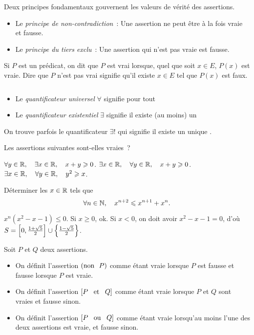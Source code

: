 \documentclass{magnoliaold}
\begin{document}
\begin{remarques}
\remarque Deux principes fondamentaux gouvernent les valeurs de vérité des assertions.
  \begin{itemize}
  \item Le \emph{principe de non-contradiction}~: Une assertion ne peut être à la fois vraie et fausse.
  \item Le \emph{principe du tiers exclu}~: Une assertion qui n'est pas vraie est fausse.
  \end{itemize}
\remarque Si $P$ est un prédicat, on dit que $P$ est vrai lorsque, quel que
  soit $x\in E$, $P(x)$ est vraie. Dire que $P$ n'est pas vrai
  signifie qu'il existe $x\in E$ tel que $P(x)$ est faux.
\end{remarques}

\begin{definition}[utile=-3]
$\quad$
\begin{itemize}
\item Le \emph{quantificateur universel} $\forall$ signifie \og pour tout \fg
\item Le \emph{quantificateur existentiel} $\exists$ signifie \og il existe (au moins) un \fg
\end{itemize}
\end{definition}

\begin{remarqueUnique}
\remarque On trouve parfois le quantificateur $\exists !$ qui signifie
  \og il existe un unique \fg. 
\end{remarqueUnique}

\begin{exos}
\exo Les assertions suivantes sont-elles vraies~?
  \begin{questions}
  \question $\forall y\in\mathbb{R} ,\quad \exists x\in\mathbb{R} ,\quad x+y\geqslant 0$.
  \question $\exists x\in\mathbb{R} ,\quad \forall y\in\mathbb{R} ,\quad x+y\geqslant 0$.
  \question $\exists x\in\mathbb{R} ,\quad \forall y\in\mathbb{R} ,\quad y^2\geqslant x$.
  \end{questions}
\exo Déterminer les $x\in\mathbb{R}$ tels que
  \[\forall n\in\mathbb{N} ,\quad x^{n+2}\leqslant x^{n+1}+x^n.\]
\end{exos}

\begin{sol}
$x^n(x^2-x-1)\leq 0$. Si $x\geq 0$, ok.
Si $x<0$, on doit avoir $x^2-x-1=0$, d'où $S= \left[0,\frac{1+\sqrt{5}}{2}\right]\cup\left\{\frac{1-\sqrt{5}}{2}\right\}$.
\end{sol}

\begin{definition}[utile=-3]
Soit $P$ et $Q$ deux assertions.
\begin{itemize}
\item On définit l'assertion $\left({\rm non}\ \  P\right)$ comme étant vraie
  lorsque $P$ est fausse et fausse lorsque $P$ est vraie.
\item On définit l'assertion $\left[P \quad\!\text{et}\quad\! Q\right]$ comme étant vraie
  lorsque $P$ et $Q$ sont vraies et fausse sinon.
\item On définit l'assertion $\left[P \quad\!\text{ou}\quad\! Q\right]$ comme étant vraie
  lorsqu'au moins l'une des deux assertions est vraie, et fausse sinon.
\end{itemize}
\end{definition}
\end{document}
